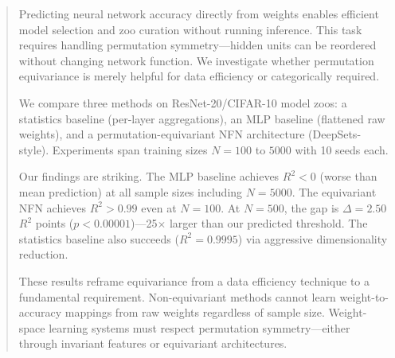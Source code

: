 \begin{abstract}
Predicting neural network accuracy directly from weights enables efficient model selection and zoo curation without running inference. This task requires handling permutation symmetry---hidden units can be reordered without changing network function. We investigate whether permutation equivariance is merely helpful for data efficiency or categorically required.

We compare three methods on ResNet-20/CIFAR-10 model zoos: a statistics baseline (per-layer aggregations), an MLP baseline (flattened raw weights), and a permutation-equivariant NFN architecture (DeepSets-style). Experiments span training sizes $N=100$ to $5000$ with 10 seeds each.

Our findings are striking. The MLP baseline achieves $R^2 < 0$ (worse than mean prediction) at all sample sizes including $N=5000$. The equivariant NFN achieves $R^2 > 0.99$ even at $N=100$. At $N=500$, the gap is $\Delta=2.50$ $R^2$ points ($p < 0.00001$)---25$\times$ larger than our predicted threshold. The statistics baseline also succeeds ($R^2 = 0.9995$) via aggressive dimensionality reduction.

These results reframe equivariance from a data efficiency technique to a fundamental requirement. Non-equivariant methods cannot learn weight-to-accuracy mappings from raw weights regardless of sample size. Weight-space learning systems must respect permutation symmetry---either through invariant features or equivariant architectures.
\end{abstract}
